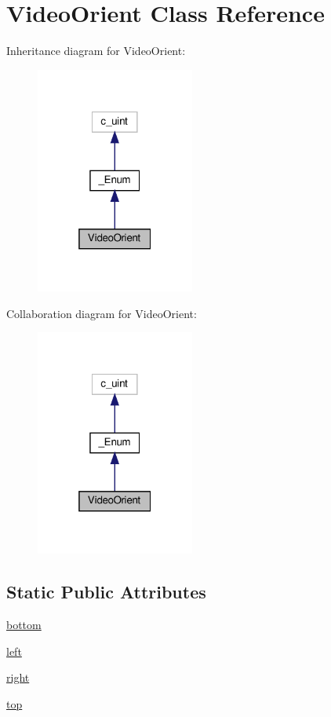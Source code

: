 \hypertarget{classvlc_1_1_video_orient}{}\section{Video\+Orient Class Reference}
\label{classvlc_1_1_video_orient}


Inheritance diagram for Video\+Orient\+:
\nopagebreak
\begin{figure}[H]
\begin{center}
\leavevmode
\includegraphics[width=148pt]{classvlc_1_1_video_orient__inherit__graph}
\end{center}
\end{figure}


Collaboration diagram for Video\+Orient\+:
\nopagebreak
\begin{figure}[H]
\begin{center}
\leavevmode
\includegraphics[width=148pt]{classvlc_1_1_video_orient__coll__graph}
\end{center}
\end{figure}
\subsection*{Static Public Attributes}
\begin{DoxyCompactItemize}
\item 
\hyperlink{classvlc_1_1_video_orient_a1e1e13bec2639fca768af56dd3b64e9a}{bottom}
\item 
\hyperlink{classvlc_1_1_video_orient_a58c76f848f15df202254c1daec468567}{left}
\item 
\hyperlink{classvlc_1_1_video_orient_a25331d5f9601b8cb1ce57490930d7c01}{right}
\item 
\hyperlink{classvlc_1_1_video_orient_a8aab264665f2085687d9eeca4c67a691}{top}
\end{DoxyCompactItemize}

